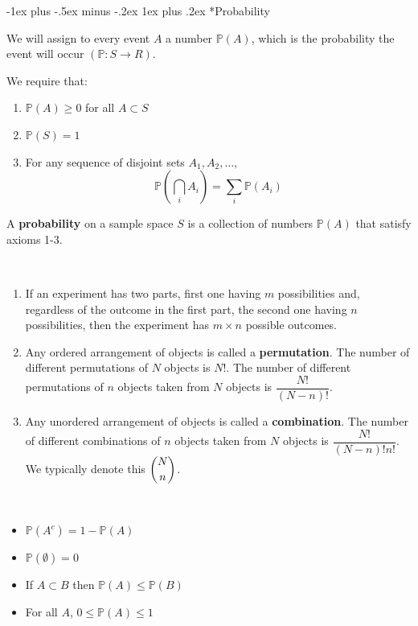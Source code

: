 \documentclass[a4paper,10pt,landscape]{article}
\makeatletter
\renewcommand{\subsubsection}{\@startsection{subsubsection}{3}{0mm}%
                                {-1ex plus -.5ex minus -.2ex}%
                                {1ex plus .2ex}%
                                {\normalfont\small\bfseries}}
\makeatother
\begin{document}
\begin{multicols*}{3}
\subsubsection*{Probability}
\begin{description}
	\item We will assign to every event $A$ a number $\mathbb{P}\left(A\right)$, which is the probability the event will occur $\left(\mathbb{P}:S\rightarrow R\right)$.
	\item We require that:
	\begin{enumerate}
		\item $\mathbb{P}(A)\geq0$ for all $A\subset S$
		\item $\mathbb{P}(S)=1$
		\item For any sequence of disjoint sets $A_1, A_2,\dots,$ $$\mathbb{P}\left(\bigcap_iA_i\right)=\sum_{i}\mathbb{P}\left(A_i\right)$$
	\end{enumerate}
	\item A {\bf probability} on a sample space $S$ is a collection of numbers $\mathbb{P}(A)$ that satisfy axioms 1-3.
	\item[Counting] ~
	\begin{enumerate}
		\item If an experiment has two parts, first one having $m$ possibilities and, regardless of the outcome in the first part, the second one having $n$ possibilities, then the experiment has $m\times n$ possible outcomes.
		\item Any ordered arrangement of objects is called a {\bf permutation}. The number of different permutations of $N$ objects is $N!$. The number of different permutations of $n$ objects taken from $N$ objects is $\dfrac{N!}{(N-n)!}$.
		\item Any unordered arrangement of objects is called a {\bf combination}. The number of different combinations of $n$ objects taken from $N$ objects is $\dfrac{N!}{(N-n)!n!}$. We typically denote this $\dbinom{N}{n}$.
	\end{enumerate}
	\item[Properties:] ~
	\begin{itemize}[itemsep=0.5pt]
		\item $\mathbb{P}\left(A^c\right)=1-\mathbb{P}\left(A\right)$
		\item $\mathbb{P}\left(\emptyset\right)=0$
		\item If $A\subset B$ then $\mathbb{P}\left(A\right)\leq\mathbb{P}\left(B\right)$
		\item For all $A$, $0\leq\mathbb{P}\left(A\right)\leq1$

\end{itemize}
\end{description}
\end{multicols*}
\end{document}
